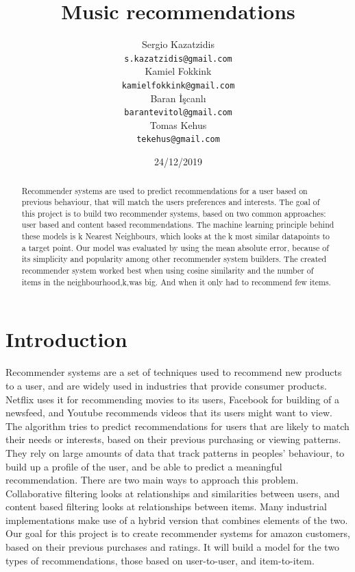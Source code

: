 \documentclass[11pt]{article}
\title{Music recommendations}
\author{Sergio Kazatzidis \\
    {\tt s.kazatzidis@gmail.com} \\
    Kamiel Fokkink \\
    {\tt kamielfokkink@gmail.com} \\\And
    Baran İşcanlı \\
    {\tt barantevitol@gmail.com} \\
    Tomas Kehus \\
    {\tt tekehus@gmail.com}}
\date{24/12/2019}
\begin{document}
\maketitle
\begin{abstract}
    Recommender systems are used to predict recommendations for a user based on previous behaviour, that will match the users preferences and interests. The goal of this project is to build two recommender systems, based on two common approaches: user based and content based recommendations. The machine learning principle behind these models is k Nearest Neighbours, which looks at the k most similar datapoints to a target point. Our model was evaluated by using the mean absolute error, because of its simplicity and popularity among other recommender system builders. The created recommender system worked best when using cosine similarity and the number of items in the neighbourhood,k,was big. And when it only had to recommend few items.
\end{abstract}

\noindent

\section{Introduction}
Recommender systems are a set of techniques used to recommend new products to a user, and are widely used in industries that provide consumer products. Netflix uses it for recommending movies to its users, Facebook for building of a newsfeed, and Youtube recommends videos that its users might want to view. The algorithm tries to predict recommendations for users that are likely to match their needs or interests, based on their previous purchasing or viewing patterns. They rely on large amounts of data that track patterns in peoples' behaviour, to build up a profile of the user, and be able to predict a meaningful recommendation. There are two main ways to approach this problem. Collaborative filtering looks at relationships and similarities between users, and content based filtering looks at relationships between items. Many industrial implementations make use of a hybrid version that combines elements of the two. Our goal for this project is to create recommender systems for amazon customers, based on their previous purchases and ratings. It will build a model for the two types of recommendations, those based on user-to-user, and item-to-item. \\
\end{document}
